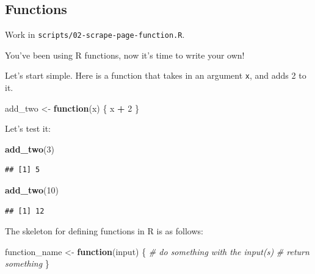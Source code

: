 \documentclass[
]{article}
\newenvironment{Shaded}{\begin{snugshade}}{\end{snugshade}}
\newcommand{\CommentTok}[1]{\textcolor[rgb]{0.56,0.35,0.01}{\textit{#1}}}
\newcommand{\ControlFlowTok}[1]{\textcolor[rgb]{0.13,0.29,0.53}{\textbf{#1}}}
\newcommand{\DecValTok}[1]{\textcolor[rgb]{0.00,0.00,0.81}{#1}}
\newcommand{\FunctionTok}[1]{\textcolor[rgb]{0.13,0.29,0.53}{\textbf{#1}}}
\newcommand{\NormalTok}[1]{#1}
\newcommand{\OtherTok}[1]{\textcolor[rgb]{0.56,0.35,0.01}{#1}}
\newcommand{\SpecialCharTok}[1]{\textcolor[rgb]{0.81,0.36,0.00}{\textbf{#1}}}
\begin{document}
\subsection{Functions}\label{functions}

Work in \texttt{scripts/02-scrape-page-function.R}.

You've been using R functions, now it's time to write your own!

Let's start simple. Here is a function that takes in an argument
\texttt{x}, and adds 2 to it.

\begin{Shaded}
\begin{Highlighting}[]
\NormalTok{add\_two }\OtherTok{\textless{}{-}} \ControlFlowTok{function}\NormalTok{(x) \{}
\NormalTok{  x }\SpecialCharTok{+} \DecValTok{2}
\NormalTok{\}}
\end{Highlighting}
\end{Shaded}

Let's test it:

\begin{Shaded}
\begin{Highlighting}[]
\FunctionTok{add\_two}\NormalTok{(}\DecValTok{3}\NormalTok{)}
\end{Highlighting}
\end{Shaded}

\begin{verbatim}
## [1] 5
\end{verbatim}

\begin{Shaded}
\begin{Highlighting}[]
\FunctionTok{add\_two}\NormalTok{(}\DecValTok{10}\NormalTok{)}
\end{Highlighting}
\end{Shaded}

\begin{verbatim}
## [1] 12
\end{verbatim}

The skeleton for defining functions in R is as follows:

\begin{Shaded}
\begin{Highlighting}[]
\NormalTok{function\_name }\OtherTok{\textless{}{-}} \ControlFlowTok{function}\NormalTok{(input) \{}
  \CommentTok{\# do something with the input(s)}
  \CommentTok{\# return something}
\NormalTok{\}}
\end{Highlighting}
\end{Shaded}
\end{document}
